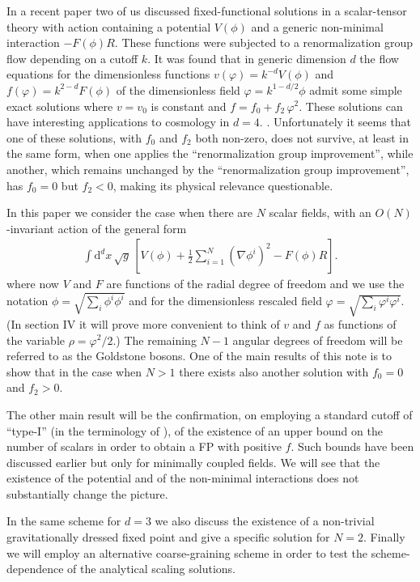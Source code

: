 \documentclass[11pt,draft]{book} %
\begin{document}
In a recent paper \cite{Percacci:2015wwa} two of us discussed
fixed-functional solutions
in a scalar-tensor theory with action containing a potential $V(\phi)$
and a generic non-minimal interaction $-F(\phi)R$.
These functions were subjected to a renormalization group flow
depending on a cutoff $k$.
It was found that in generic dimension $d$ the flow equations for the dimensionless
functions $v(\varphi)=k^{-d}V(\phi)$ and $f(\varphi)=k^{2-d}F(\phi)$
of the dimensionless field $\varphi=k^{1-d/2}\phi$
admit some simple exact solutions where $v=v_0$ is constant and
$f=f_0 + f_2 \, \varphi^2$.
These solutions can have interesting applications to cosmology in $d=4$.
\cite{Henz:2013oxa}.
Unfortunately it seems that one of these solutions,
with $f_0$ and $f_2$ both non-zero, does not survive,
at least in the same form, when one applies the
``renormalization group improvement'',
while another, which remains unchanged by the
``renormalization group improvement'',
has $f_0=0$ but $f_2<0$, making its physical relevance questionable.

In this paper we consider the case when
there are $N$ scalar fields, with an $O(N)$-invariant
action of the general form
\begin{align}
  \label{action}
  \int \mathrm d^dx \, \sqrt{g} \,
  \left[ V(\phi) + \frac{1}{2}\sum_{i=1}^N \left( \nabla\phi^i \right)^2 - F(\phi)R \right] .
\end{align}
where now $V$ and $F$ are functions of the radial degree of freedom
and we use the notation $\phi=\sqrt{\sum_i \phi^i\phi^i}$ and for the dimensionless rescaled field
$\varphi=\sqrt{\sum_i \varphi^i \varphi^i}$.
(In section IV it will prove more convenient to think of
$v$ and $f$ as functions of the variable $\rho=\varphi^2/2$.)
The remaining $N-1$ angular degrees
of freedom will be referred to as the Goldstone bosons.
One of the main results of this note is to show that in the case
when $N>1$ there exists also another solution with $f_0=0$ and $f_2>0$.

The other main result will be the confirmation,
on employing a standard cutoff of ``type-I''
(in the terminology of \cite{Codello:2008vh}),
of the existence  of an upper bound on the number of scalars in order to obtain a FP with positive $f$.
Such bounds have been discussed earlier but only for minimally
coupled fields.
We will see that the existence of the potential and of the non-minimal interactions does
not substantially change the picture.

In the same scheme for $d=3$ we also discuss the existence
of a non-trivial gravitationally dressed fixed point
and give a specific solution for $N=2$.
Finally we will employ an alternative coarse-graining scheme
in order to test the scheme-dependence of the analytical scaling solutions.
\end{document}

